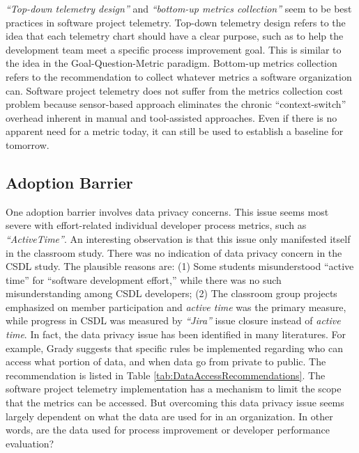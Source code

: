 \textit{``Top-down telemetry design''} and \textit{``bottom-up metrics collection''} seem to be best practices in software project telemetry. Top-down telemetry design refers to the idea that each telemetry chart should have a clear purpose, such as to help the development team meet a specific process improvement goal. This is similar to the idea in the Goal-Question-Metric paradigm. Bottom-up metrics collection refers to the recommendation to collect whatever metrics a software organization can. Software project telemetry does not suffer from the metrics collection cost problem because sensor-based approach eliminates the chronic ``context-switch'' overhead inherent in manual and tool-assisted approaches. Even if there is no apparent need for a metric today, it can still be used to establish a baseline for tomorrow.







\subsection{Adoption Barrier}

One adoption barrier involves data privacy concerns. This issue seems most severe with effort-related individual developer process metrics, such as \textit{``ActiveTime''}. An interesting observation is that this issue only manifested itself in the classroom study. There was no indication of data privacy concern in the CSDL study. The plausible reasons are: (1) Some students misunderstood ``active time'' for ``software development effort,'' while there was no such misunderstanding among CSDL developers; (2) The classroom group projects emphasized on member participation and \textit{active time} was the primary measure, while progress in CSDL was measured by \textit{``Jira''} issue closure instead of \textit{active time}. 
In fact, the data privacy issue has been identified in many literatures. For example, Grady \cite{Grady:1992} suggests that specific rules be implemented regarding who can access what portion of data, and when data go from private to public. The recommendation is listed in Table \ref{tab:DataAccessRecommendations}.
The software project telemetry implementation has a mechanism to limit the scope that the metrics can be accessed. But overcoming this data privacy issue seems largely dependent on what the data are used for in an organization. In other words, are the data used for process improvement or developer performance evaluation?

